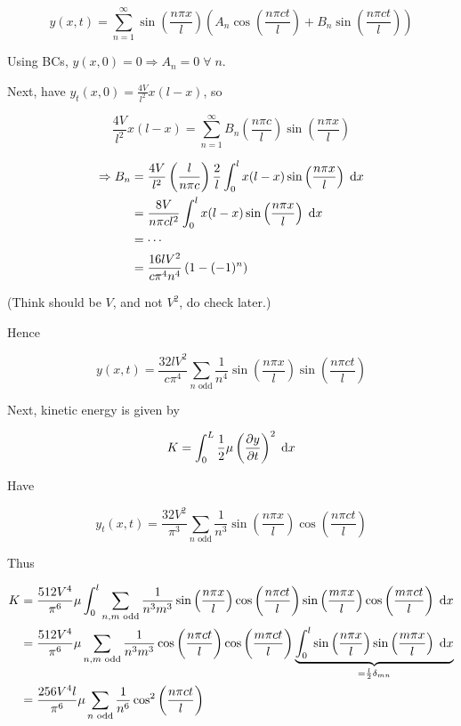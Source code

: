\documentclass[a4paper]{article}
\begin{document}
\[ y(x,t) = \sum_{n=1}^{\infty} \sin \left(  \frac{n \pi x}{l} \right)  \left(  A_{n} \cos  \left(  \frac{n \pi ct}{l} \right) + B_{n} \sin  \left(  \frac{n \pi ct}{l} \right) \right)    \]

Using BCs, $ y(x,0) = 0 \Rightarrow A_{n} = 0 \; \forall \; n $.

Next, have $ y_{t}(x,0) = \frac{4V}{l^{2}} x (l - x) $, so 


\[ \frac{4V}{l^{2}} x (l - x) = \sum_{n=1}^{\infty}  B_{n} \left( \frac{n \pi c}{l} \right)  \sin \left(  \frac{n \pi x}{l} \right)     \]

\begin{align*}
\Rightarrow B_{n} & = \frac{4V}{l^{2}} \left(  \frac{l}{n \pi c} \right)  \frac{2}{l}   \int_{0}^{l}  x(l-x) \sin \left(  \frac{n \pi x}{l} \right) \; \mathrm{d} x   \\
& = \frac{8V}{n \pi c l^{2}}  \int_{0}^{l}  x(l-x) \sin \left(  \frac{n \pi x}{l} \right) \; \mathrm{d} x  \\
& = \cdots \\
& = \frac{16 l V^{2}}{c \pi^{4} n^{4}} \left(  1 - (-1)^{n} \right)  
\end{align*}

(Think should be $ V $, and not $ V^{2} $, do check later.)

Hence

\[ y(x,t) = \frac{32 l V^{2}}{c \pi^{4}} \sum_{n \text{ odd}} \frac{1}{n^{4} }\sin \left(  \frac{n \pi x}{l} \right) \sin  \left(  \frac{n \pi ct}{l} \right)    \]

Next, kinetic energy is given by

\begin{align*}
K & = \int_{0}^{L} \frac{1}{2} \mu \left(  \frac{\partial y}{\partial t} \right)^{2} \; \mathrm{d} x   \\
\end{align*}


Have

\[y_{t}(x,t) = \frac{32V^{2}}{\pi^{3}} \sum_{n \text{ odd}} \frac{1}{n^{3}} \sin \left( \frac{n \pi x}{l} \right)  \cos \left( \frac{n \pi c t}{l}    \right)   \] 


Thus 

\begin{align*}
K & = \frac{512 V^{4}}{\pi^{6}} \mu \int_{0}^{l}  \sum_{n,m \text{ odd}} \frac{1}{n^{3}m^{3}} \sin \left( \frac{n \pi x}{l} \right)  \cos \left( \frac{n \pi c t}{l}\right)  \sin \left( \frac{m \pi x}{l} \right)  \cos \left( \frac{m \pi c t}{l} \right) \; \mathrm{d} x   \\
& = \frac{512 V^{4}}{\pi^{6}} \mu  \sum_{n,m \text{ odd}} \frac{1}{n^{3}m^{3}}  \cos \left( \frac{n \pi c t}{l}\right)   \cos \left( \frac{m \pi c t}{l} \right) \underbrace{\int_{0}^{l} \sin \left( \frac{n \pi x}{l} \right) \sin \left( \frac{m \pi x}{l} \right)   \; \mathrm{d} x  }_{= \frac{l}{2} \delta_{mn}} \\
& = \frac{256 V^{4} l}{\pi^{6}} \mu  \sum_{n\text{ odd}} \frac{1}{n^{6}}  \cos^{2} \left( \frac{n \pi c t}{l}\right) 
\end{align*}
\end{document}
